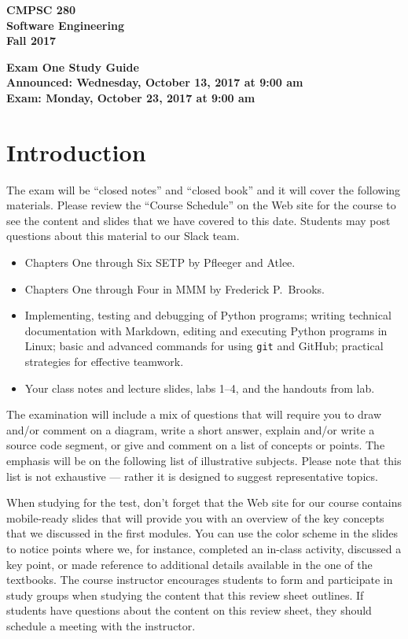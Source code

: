 \documentclass[11pt]{article}
\newcommand{\assignmentduedate}{October 23}
\newcommand{\assignmentassignedate}{October 13}
\newcommand{\assignmentnumber}{One}
\newcommand{\labyear}{2017}
\newcommand{\assignedday}{Wednesday}
\newcommand{\dueday}{Monday}
\newcommand{\labtime}{9:00 am}
\newcommand{\assigneddate}{Announced: \assignedday, \assignmentassignedate, \labyear{} at \labtime{}}
\newcommand{\duedate}{Exam: \dueday, \assignmentduedate, \labyear{} at \labtime{}}
\newcommand{\guidetitle}[1]
{
  \begin{center}
    \begin{center}
      \bf
      CMPSC 280\\Software Engineering\\
      Fall 2017\\
      \medskip
    \end{center}
    \bf
    #1
  \end{center}
}
\begin{document}
\thispagestyle{empty}

\guidetitle{Exam \assignmentnumber{} Study Guide \\ \assigneddate{} \\ \duedate{}}

\section*{Introduction}

\noindent
The exam will be ``closed notes'' and ``closed book'' and it will cover the
following materials. Please review the ``Course Schedule'' on the Web site for
the course to see the content and slides that we have covered to this date.
Students may post questions about this material to our Slack team.

\begin{itemize}

  \itemsep 0in

  \item Chapters One through Six SETP by Pfleeger and Atlee.

  \item Chapters One through Four in MMM by Frederick P.\ Brooks.

  \item Implementing, testing and debugging of Python programs; writing
    technical documentation with Markdown, editing and executing Python programs
    in Linux; basic and advanced commands for using {\tt git} and GitHub;
    practical strategies for effective teamwork.

  \item Your class notes and lecture slides, labs 1--4, and the handouts from
    lab.

\end{itemize}

\noindent The examination will include a mix of questions that will require you
to draw and/or comment on a diagram, write a short answer, explain and/or write
a source code segment, or give and comment on a list of concepts or points. The
emphasis will be on the following list of illustrative subjects. Please note
that this list is not exhaustive --- rather it is designed to suggest
representative topics.

When studying for the test, don't forget that the Web site for our course
contains mobile-ready slides that will provide you with an overview of the key
concepts that we discussed in the first modules. You can use the color scheme in
the slides to notice points where we, for instance, completed an in-class
activity, discussed a key point, or made reference to additional details
available in the one of the textbooks. The course instructor encourages students
to form and participate in study groups when studying the content that this
review sheet outlines. If students have questions about the content on this
review sheet, they should schedule a meeting with the instructor.
\end{document}
